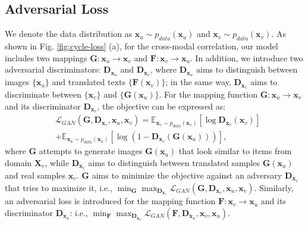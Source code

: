 \documentclass[10pt,journal,twocolumn]{IEEEtran}
\begin{document}
\subsection{Adversarial Loss}

We denote the data distribution as $\boldsymbol x_u \sim p_{data} (\boldsymbol x_u)$ and $\boldsymbol x_v \sim p_{data} (\boldsymbol x_v)$. As shown in Fig. \ref{fig:cycle-loss} (a), for the cross-modal correlation, our model includes two mappings $\boldsymbol G: \boldsymbol x_u \rightarrow \boldsymbol x_v$ and $\boldsymbol F: \boldsymbol x_v \rightarrow \boldsymbol x_u$. In addition, we introduce two adversarial discriminators: $\boldsymbol D_{\boldsymbol x_u}$ and $\boldsymbol D_{\boldsymbol x_v}$, where $\boldsymbol D_{\boldsymbol x_u}$ aims to distinguish between images $\{\boldsymbol x_u\}$ and translated texts $\{\boldsymbol F(\boldsymbol x_v)\}$; in the same way, $\boldsymbol D_{\boldsymbol x_v}$ aims to discriminate between $\{ \boldsymbol x_v\}$ and $\{\boldsymbol G(\boldsymbol x_u)\}$. For the mapping function $\boldsymbol G: \boldsymbol x_u \rightarrow \boldsymbol x_v$ and its discriminator $\boldsymbol D_{\boldsymbol x_v}$, the objective can be expressed as:
\begin{equation}\label{eq:adversarial}
\begin{split}
     & \mathcal{L}_{GAN} (\boldsymbol G, \boldsymbol D_{\boldsymbol x_v}, \boldsymbol x_u, \boldsymbol x_v)= \mathbb{E}_{\boldsymbol x_v \sim p_{data} (\boldsymbol x_v)} [\log \boldsymbol D_{\boldsymbol x_v}(\boldsymbol x_v)] \\
     & + \mathbb{E}_{\boldsymbol x_u \sim p_{data} (\boldsymbol x_u)} [\log ( 1 - \boldsymbol D_{\boldsymbol x_v}( \boldsymbol G (\boldsymbol x_u) ))],
\end{split}
\end{equation}
where $\boldsymbol G$ attempts to generate images $\boldsymbol G (\boldsymbol x_u)$ that look similar to items from domain $\boldsymbol X_v$, while $\boldsymbol D_{\boldsymbol x_v}$ aims to distinguish between translated samples $\boldsymbol G (\boldsymbol x_u)$ and real samples $\boldsymbol x_v$. $\boldsymbol G$ aims to minimize the objective against an adversary $\boldsymbol D_{\boldsymbol x_v}$ that tries to maximize it, i.e., $\min_{\boldsymbol G} \max_{\boldsymbol D_{\boldsymbol x_v}} \mathcal{L}_{GAN} (\boldsymbol G, \boldsymbol D_{\boldsymbol x_v}, \boldsymbol x_u, \boldsymbol x_v)$. Similarly, an adversarial loss is introduced for the mapping function $\boldsymbol F: \boldsymbol x_v \rightarrow \boldsymbol x_u$ and its discriminator $\boldsymbol D_{\boldsymbol x_u}$: i.e., $\min_{\boldsymbol F} \max_{\boldsymbol D_{\boldsymbol x_u}} \mathcal{L}_{GAN} (\boldsymbol F, \boldsymbol D_{\boldsymbol x_u}, \boldsymbol x_v, \boldsymbol x_u)$.
\end{document}
